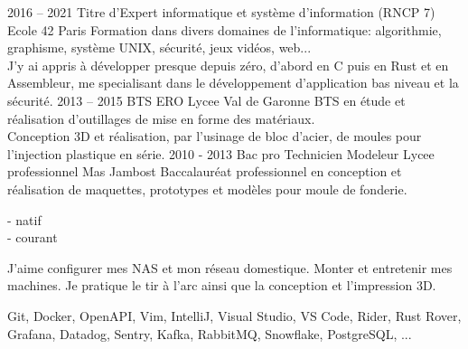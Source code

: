 \documentclass[8pt]{developercv} %
\begin{document}
\begin{entrylist}
	\entry
		{2016 -- 2021}
		{Titre d'Expert informatique et système d'information (RNCP 7)}
		{Ecole 42 Paris}
		{
			Formation dans divers domaines de l'informatique: algorithmie, graphisme, système UNIX, sécurité, jeux vidéos, web...\\
			J'y ai appris à développer presque depuis zéro, d'abord en C puis en Rust et en Assembleur, me specialisant dans le développement d'application bas niveau et la sécurité.
		}
	\entry
		{2013 -- 2015}
		{BTS ERO}
		{Lycee Val de Garonne}
		{
			BTS en étude et réalisation d'outillages de mise en forme des matériaux.\\
			Conception 3D et réalisation, par l'usinage de bloc d'acier, de moules pour l'injection plastique en série.
		}
	\entry
		{2010 - 2013}
		{Bac pro Technicien Modeleur}
		{Lycee professionnel Mas Jambost}
		{
			Baccalauréat professionnel en conception et réalisation de maquettes, prototypes et modèles pour moule de fonderie.
		}
\end{entrylist}

\vfill %
\begin{minipage}[t]{0.2\textwidth} %
	\vspace{-\baselineskip} %


	 - natif\\
	 - courant\\
\end{minipage}
\hfill
\begin{minipage}[t]{0.35\textwidth} %
	\vspace{-\baselineskip} %


	J'aime configurer mes NAS et mon réseau domestique. Monter et entretenir mes machines. Je pratique le tir à l'arc ainsi que la conception et l'impression 3D.
\end{minipage}
\hfill
\begin{minipage}[t]{0.35\textwidth} %
	\vspace{-\baselineskip} %


	Git, Docker, OpenAPI, Vim, IntelliJ, Visual Studio, VS Code, Rider, Rust Rover, Grafana, Datadog, Sentry, Kafka, RabbitMQ, Snowflake, PostgreSQL, ...
\end{minipage}
\vspace{\baselineskip}
\end{document}
